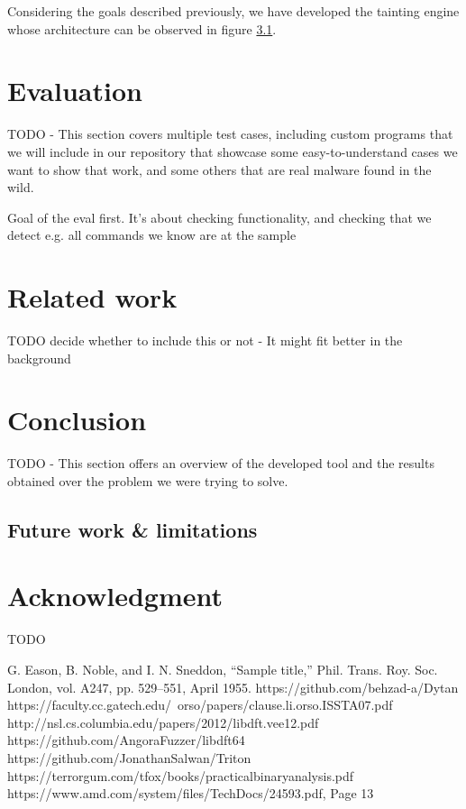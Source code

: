 \documentclass[conference]{IEEEtran}
\begin{document}
Considering the goals described previously, we have developed the tainting engine whose
architecture can be observed in figure \ref{}.




\section{Evaluation}
TODO - This section covers multiple test cases, including custom programs that
we will include in our repository that showcase some easy-to-understand cases
we want to show that work, and some others that are real malware found in the
wild.

Goal of the eval first. It's about checking functionality, and checking that we
detect e.g. all commands we know are at the sample

\section{Related work}
TODO decide whether to include this or not - It might fit better in the
background

\section{Conclusion}
TODO - This section offers an overview of the developed tool and the results
obtained over the problem we were trying to solve.

\subsection{Future work \& limitations}

\section*{Acknowledgment}
TODO

\begin{thebibliography}{00}
     G. Eason, B. Noble, and I. N. Sneddon, ``Sample title,'' Phil. Trans. Roy. Soc. London, vol. A247, pp. 529--551, April 1955.
     https://github.com/behzad-a/Dytan
     https://faculty.cc.gatech.edu/~orso/papers/clause.li.orso.ISSTA07.pdf
     http://nsl.cs.columbia.edu/papers/2012/libdft.vee12.pdf
     https://github.com/AngoraFuzzer/libdft64
     https://github.com/JonathanSalwan/Triton
     https://terrorgum.com/tfox/books/practicalbinaryanalysis.pdf
     https://www.amd.com/system/files/TechDocs/24593.pdf, Page 13

\end{thebibliography}
\vspace{12pt}
\end{document}
